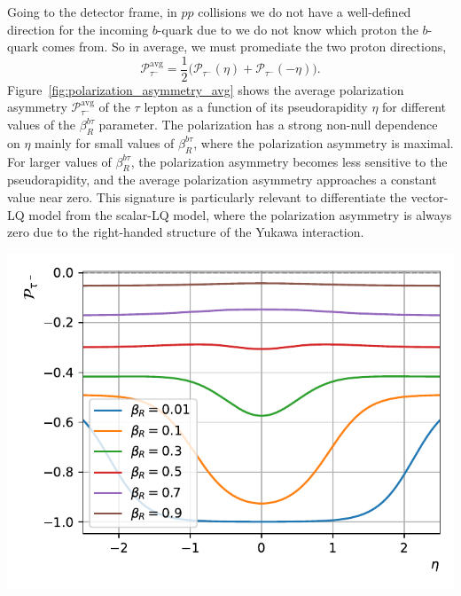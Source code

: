 Going to the detector frame, in $pp$ collisions we do not have a well-defined direction for the incoming $b$-quark due to we do not know which proton the $b$-quark comes from. So in average, we must promediate the two proton directions, 
\begin{equation}
    \mathcal{P}_{\tau^-}^{\text{avg}} = \frac{1}{2}\big(\mathcal{P}_{\tau^-}(\eta) + \mathcal{P}_{\tau^-}(-\eta)\big).
\end{equation}
Figure~\ref{fig:polarization_asymmetry_avg} shows the average polarization asymmetry $\mathcal{P}_{\tau^-}^{\text{avg}}$ of the $\tau$ lepton as a function of its pseudorapidity $\eta$ for different values of the $\beta_R^{b\tau}$ parameter. The polarization has a strong non-null dependence on $\eta$ mainly for small values of $\beta_R^{b\tau}$, where the polarization asymmetry is maximal. For larger values of $\beta_R^{b\tau}$, the polarization asymmetry becomes less sensitive to the pseudorapidity, and the average polarization asymmetry approaches a constant value near zero. This signature is particularly relevant to differentiate the vector-LQ model from the scalar-LQ model, where the polarization asymmetry is always zero due to the right-handed structure of the Yukawa interaction.

\begin{center}
    \includegraphics[width=.9\linewidth]{Images/P_vlQ_tau_minus_vs_eta_avg.pdf}
    \label{fig:polarization_asymmetry_avg}
\end{center}

